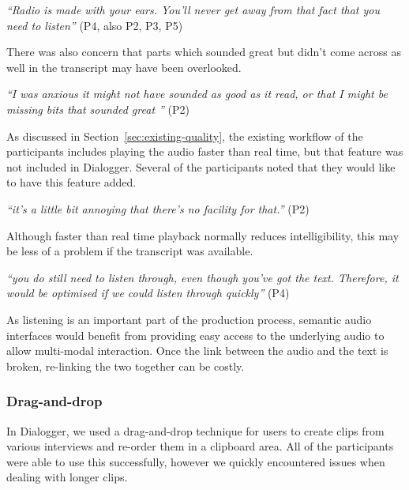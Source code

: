 \textit{``Radio is made with your ears. You'll never get away from that fact that you need to listen''} (P4, also P2,
P3, P5)

There was also concern that parts which sounded great but didn't come across as well in the transcript may have been
overlooked.

\textit{``I was anxious it might not have sounded as good as it read, or that I might be missing bits that sounded
  great ''} (P2)

As discussed in Section~\ref{sec:existing-quality}, the existing workflow of the participants includes playing the
audio faster than real time, but that feature was not included in Dialogger.  Several of the participants noted that
they would like to have this feature added.

\textit{``it's a little bit annoying that there's no facility for that.''} (P2)

Although faster than real time playback normally reduces intelligibility, this may be less of a problem if the
transcript was available.

\textit{``you do still need to listen through, even though you've got the text.  Therefore, it would be optimised if we
  could listen through quickly''} (P4)

As listening is an important part of the production process, semantic audio interfaces would benefit from providing
easy access to the underlying audio to allow multi-modal interaction. Once the link between the audio and the text is
broken, re-linking the two together can be costly.



\subsubsection{Drag-and-drop}

In Dialogger, we used a drag-and-drop technique for users to create clips from various interviews and
re-order them in a clipboard area. All of the participants were able to use this successfully, however we quickly
encountered issues when dealing with longer clips.


